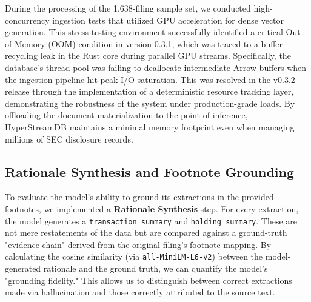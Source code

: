 \documentclass[journal, onecolumn]{IEEEtran}
\begin{document}
During the processing of the 1,638-filing sample set, we conducted high-concurrency ingestion tests that utilized GPU acceleration for dense vector generation. This stress-testing environment successfully identified a critical Out-of-Memory (OOM) condition in version 0.3.1, which was traced to a buffer recycling leak in the Rust core during parallel GPU streams. Specifically, the database's thread-pool was failing to deallocate intermediate Arrow buffers when the ingestion pipeline hit peak I/O saturation. This was resolved in the v0.3.2 release through the implementation of a deterministic resource tracking layer, demonstrating the robustness of the system under production-grade loads. By offloading the document materialization to the point of inference, HyperStreamDB maintains a minimal memory footprint even when managing millions of SEC disclosure records.

\subsection{Rationale Synthesis and Footnote Grounding}
To evaluate the model's ability to ground its extractions in the provided footnotes, we implemented a \textbf{Rationale Synthesis} step. For every extraction, the model generates a \texttt{transaction\_summary} and \texttt{holding\_summary}. These are not mere restatements of the data but are compared against a ground-truth "evidence chain" derived from the original filing's footnote mapping. By calculating the cosine similarity (via \texttt{all-MiniLM-L6-v2}) between the model-generated rationale and the ground truth, we can quantify the model's "grounding fidelity." This allows us to distinguish between correct extractions made via hallucination and those correctly attributed to the source text.
\end{document}
